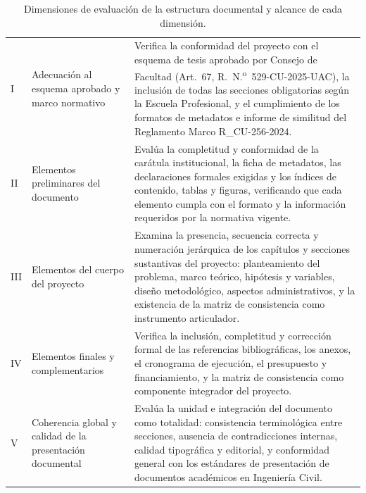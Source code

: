 \vspace{-10pt}
\begin{table}[htbp]
\centering
\scriptsize
\caption{Dimensiones de evaluación de la estructura documental y alcance de cada dimensión.}
\label{tab:dim-estructura-documental}
\begin{tabularx}{\textwidth}{|C{0.8cm}|L{2.5cm}|X|}
\hline
{}
 &  &  \\ \hline
I & Adecuación al esquema aprobado y marco normativo & Verifica la conformidad del proyecto con el esquema de tesis aprobado por Consejo de Facultad (Art.~67, R.~N.\textsuperscript{o}~529-CU-2025-UAC), la inclusión de todas las secciones obligatorias según la Escuela Profesional, y el cumplimiento de los formatos de metadatos e informe de similitud del Reglamento Marco R\_CU-256-2024. \\ \hline
{}
II & Elementos preliminares del documento & Evalúa la completitud y conformidad de la carátula institucional, la ficha de metadatos, las declaraciones formales exigidas y los índices de contenido, tablas y figuras, verificando que cada elemento cumpla con el formato y la información requeridos por la normativa vigente. \\ \hline
III & Elementos del cuerpo del proyecto & Examina la presencia, secuencia correcta y numeración jerárquica de los capítulos y secciones sustantivas del proyecto: planteamiento del problema, marco teórico, hipótesis y variables, diseño metodológico, aspectos administrativos, y la existencia de la matriz de consistencia como instrumento articulador. \\ \hline
{}
IV & Elementos finales y complementarios & Verifica la inclusión, completitud y corrección formal de las referencias bibliográficas, los anexos, el cronograma de ejecución, el presupuesto y financiamiento, y la matriz de consistencia como componente integrador del proyecto. \\ \hline
V & Coherencia global y calidad de la presentación documental & Evalúa la unidad e integración del documento como totalidad: consistencia terminológica entre secciones, ausencia de contradicciones internas, calidad tipográfica y editorial, y conformidad general con los estándares de presentación de documentos académicos en Ingeniería Civil. \\ \hline
\end{tabularx}
\end{table}

